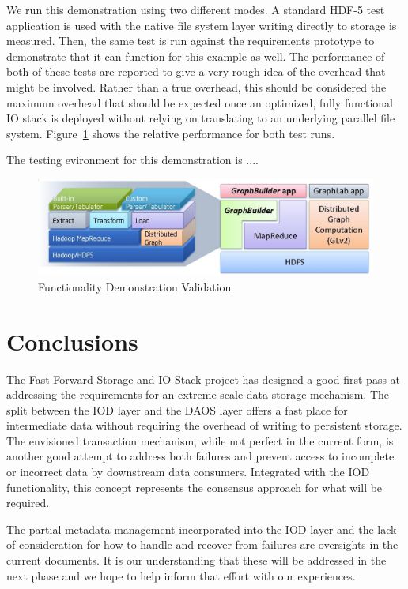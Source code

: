 \documentclass[conference]{IEEEtran}
\begin{document}
We run this demonstration using two different modes. A standard HDF-5 test
application is used with the native file system layer writing directly to
storage is measured. Then, the same test is run against the requirements
prototype to demonstrate that it can function for this example as well. The
performance of both of these tests are reported to give a very rough idea of
the overhead that might be involved. Rather than a true overhead, this should
be considered the maximum overhead that should be expected once an optimized,
fully functional IO stack is deployed without relying on translating to an
underlying parallel file system. Figure~\ref{fig:evaluation} shows the
relative performance for both test runs.

The testing evironment for this demonstration is ....

\begin{figure}[htbp]
\centering
\includegraphics[width=\columnwidth]{images/graphlab-and-graphbuilder.png}
\caption{Functionality Demonstration Validation}
\label{fig:evaluation}
\end{figure}

\section{Conclusions}
\label{sec:conclusion}

The Fast Forward Storage and IO Stack project has designed a good first pass at
addressing the requirements for an extreme scale data storage mechanism. The
split between the IOD layer and the DAOS layer offers a fast place for
intermediate data without requiring the overhead of writing to persistent
storage. The envisioned transaction mechanism, while not perfect in the current
form, is another good attempt to address both failures and prevent access to
incomplete or incorrect data by downstream data consumers. Integrated with the
IOD functionality, this concept represents the consensus approach for what will
be required.

The partial metadata management incorporated into the IOD layer and the lack of
consideration for how to handle and recover from failures are oversights in the
current documents. It is our understanding that these will be addressed in the
next phase and we hope to help inform that effort with our experiences.
\end{document}

